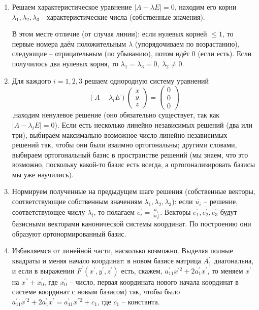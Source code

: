 \documentclass[a4paper, 12pt]{article}
\theoremstyle{definition}
\begin{document}
\begin{enumerate}
    \item Решаем характеристическое уравнение $|A - \lambda E| = 0$, находим его корни $\lambda_1, \lambda_2, \lambda_3$ - характеристические числа (собственные значения).
    
    В этом месте отличие (от случая линии): если нулевых корней $\leqslant 1$, то первые номера даём положительным $\lambda$ (упорядочиваем по возрастанию), следующие – отрицательным (по убыванию), потом идёт 0 (если есть). Если получилось два нулевых корня, то $\lambda_1 = \lambda_3 = 0, \ \lambda_2 \neq 0$.
    \item Для каждого $i = 1, 2, 3$ решаем однородную систему уравнений $$(A - \lambda_i E) \begin{pmatrix} x \\ y \\ z \end{pmatrix} = \begin{pmatrix} 0\\0\\0 \end{pmatrix}$$ ,находим ненулевое решение (оно обязательно существует, так как $|A - \lambda_i E| = 0$). Если есть несколько линейно независимых решений (два или три), выбираем максимально возможное число линейно независимых решений так, чтобы они были взаимно ортогональны;
    другими словами, выбираем ортогональный базис в пространстве решений (мы знаем, что это возможно, поскольку какой-то базис есть всегда, а ортогонализировать базисы мы уже научились).
    \item Нормируем полученные на предыдущем шаге решения (собственные векторы, соответствующие собственным значениям $\lambda_1, \lambda_2, \lambda_3$):
    если $\bar{u_i}$ – решение, соответствующее числу $\lambda_i$, то полагаем $\bar{e_i^{'}} = \frac{\bar{u_i}}{|\bar{u_i}|}$.
    Векторы $\bar{e_1^{'}}, \bar{e_2^{'}}, \bar{e_3^{'}}$ будут базисными векторами канонической системы координат. По построению они образуют ортонормированный базис.
    \item Избавляемся от линейной части, насколько возможно.
    Выделяя полные квадраты и меняя начало координат: в новом базисе матрица $A_1^{'}$ диагональна, и если в выражении $F^{'}(x^{'},y^{'},z^{'})$ есть, скажем, $a_{11}^{'} x^{'2} + 2a_{1}^{'} x^{'}$, то меняем $x^{'}$ на $x^{''} + x_0^{'}$, где $x_0^{'}$ – число, первая координата нового начала координат в системе координат с новым базисом) так, чтобы было
    $a_{11}^{'} x^{'2} + 2a_{1}^{'} x^{'} = a_{11}^{'} x^{''2} + c_1$, где $c_1$ – константа.

\end{enumerate}
\end{document}
